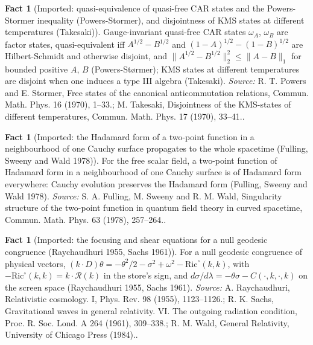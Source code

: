\documentclass[11pt]{article}
\theoremstyle{definition}
\newtheorem{fact}[theorem]{Fact}
\theoremstyle{plain}
\providecommand{\Ric}{}\renewcommand{\Ric}{\mathrm{Ric}}
\begin{document}
\begin{fact}[Imported: quasi-equivalence of quasi-free CAR states and the Powers-Stormer inequality (Powers-Stormer), and disjointness of KMS states at different temperatures (Takesaki)]\label{c:synthesis.imported-powers-stormer-takesaki-disjointness}
Gauge-invariant quasi-free CAR states $\omega_{A}$, $\omega_{B}$ are factor states, quasi-equivalent iff $A^{1/2} - B^{1/2}$ and $(1 - A)^{1/2} - (1 - B)^{1/2}$ are Hilbert-Schmidt and otherwise disjoint, and $\|A^{1/2} - B^{1/2}\|_{2}^{2} \le \|A - B\|_{1}$ for bounded positive $A$, $B$ (Powers-Størmer); KMS states at different temperatures are disjoint when one induces a type III algebra (Takesaki).
\emph{Source:} R. T. Powers and E. Stormer, Free states of the canonical anticommutation relations, Commun. Math. Phys. 16 (1970), 1--33.; M. Takesaki, Disjointness of the KMS-states of different temperatures, Commun. Math. Phys. 17 (1970), 33--41..
\end{fact}

\begin{fact}[Imported: the Hadamard form of a two-point function in a neighbourhood of one Cauchy surface propagates to the whole spacetime (Fulling, Sweeny and Wald 1978)]\label{c:synthesis.imported-propagation-of-hadamard-form}
For the free scalar field, a two-point function of Hadamard form in a neighbourhood of one Cauchy surface is of Hadamard form everywhere: Cauchy evolution preserves the Hadamard form (Fulling, Sweeny and Wald 1978).
\emph{Source:} S. A. Fulling, M. Sweeny and R. M. Wald, Singularity structure of the two-point function in quantum field theory in curved spacetime, Commun. Math. Phys. 63 (1978), 257--264..
\end{fact}

\begin{fact}[Imported: the focusing and shear equations for a null geodesic congruence (Raychaudhuri 1955, Sachs 1961)]\label{c:synthesis.imported-raychaudhuri-null-congruence}
For a null geodesic congruence of physical vectors, $(k \cdot D)\theta = -\theta^{2}/2 - \sigma^{2} + \omega^{2} - \Ric^{\circ}(k,k)$, with $-\Ric^{\circ}(k,k) = k \cdot \mathcal{R}(k)$ in the store's sign, and $d\sigma/d\lambda = -\theta\sigma - C(\cdot,k,\cdot,k)$ on the screen space (Raychaudhuri 1955, Sachs 1961).
\emph{Source:} A. Raychaudhuri, Relativistic cosmology. I, Phys. Rev. 98 (1955), 1123--1126.; R. K. Sachs, Gravitational waves in general relativity. VI. The outgoing radiation condition, Proc. R. Soc. Lond. A 264 (1961), 309--338.; R. M. Wald, General Relativity, University of Chicago Press (1984)..
\end{fact}
\end{document}
